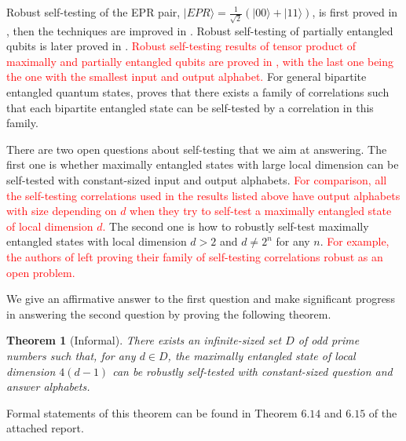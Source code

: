 \documentclass[11pt,letterpaper]{article}
\newcommand{\ket}[1]{|#1\rangle}
\newcommand{\1}{\mathbb{1}}
\newcommand{\hf}[1]{\textcolor{red}{#1}}
\newtheorem{theorem}{Theorem}[section]
\theoremstyle{definition}
\begin{document}
Robust self-testing of the EPR pair, 
$\ket{EPR} = \frac{1}{\sqrt{2}}(\ket{00}+\ket{11})$,
is first proved in \cite{mckague2012}, then 
the techniques are improved in \cite{bamps2015}.
Robust self-testing of partially entangled qubits is later proved in
\cite{yang2013}.
\hf{Robust self-testing results of tensor product of maximally and partially entangled qubits 
are proved in \cite{coladan2016parallel,natarajan2017,lowdegree},
with the last one being the one with the smallest input and output alphabet.}
For general bipartite entangled quantum states, \cite{coladan2017all} proves that there exists a family of correlations such that
each bipartite entangled state can be self-tested by a correlation in this family.



There are two open questions about self-testing that we aim at answering.
The first one is whether maximally entangled states with large local dimension
can be self-tested with constant-sized input and output alphabets. 
\hf{For comparison,
all the self-testing correlations used in the results listed above have 
output alphabets with size depending on $d$
when they try to self-test a maximally entangled state of local dimension $d$.
}
The second one is how to robustly self-test maximally entangled states
with local dimension $d > 2$ and $d \neq 2^n$ for any $n$.
\hf{For example, the authors of \cite{coladan2017all} left proving their
family of self-testing correlations robust as an open problem.}

We give an affirmative answer to the first question
and make significant progress in answering the 
second question
by proving the following theorem.  \begin{theorem}[Informal]
\label{thm:inf}
	There exists an infinite-sized set $D$ of odd prime numbers such that, for any $d \in D$, 
	the maximally entangled state of local dimension $4(d-1)$ can be robustly self-tested 
	with constant-sized question and answer alphabets.
\end{theorem}
Formal statements of this theorem can be found in Theorem $6.14$ and $6.15$
of the attached report.
\end{document}
